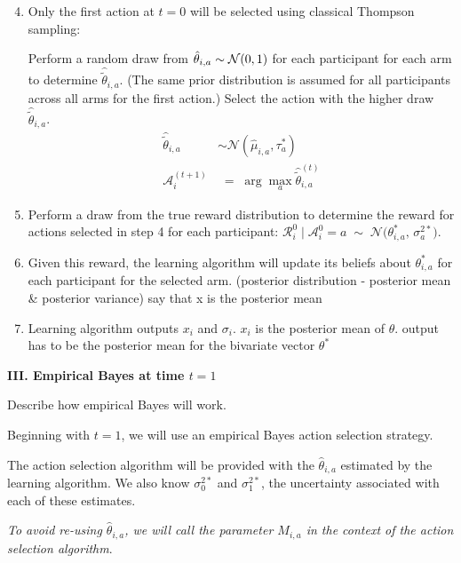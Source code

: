 \documentclass[letterpaper, 11pt]{extarticle}
\begin{document}
\begin{enumerate}
    \setcounter{enumi}{3}
    \item Only the first action at $t=0$ will be selected using classical Thompson sampling: 
    
    Perform a random draw from $\hat{\theta}_{i,a}\sim \mathcal{N}(0,1)$ for each participant for each arm to determine $\hat{\tilde{\theta}}_{i,a}$. (The same prior distribution is assumed for all participants across all arms for the first action.) Select the action with the higher draw $\hat{\tilde{\theta}}_{i,a}$.
    \begin{align*}
        \hat{\tilde{\theta}}_{i,a} &\sim \mathcal{N}(\hat{\mu}_{i,a}, \tau^{*}_{a})\\
        \mathcal A_i^{(t+1)} &\;=\; \arg\max_{a} \hat{\tilde{\theta}}_{i,a}^{(t)}
    \end{align*}
    \item Perform a draw from the true reward distribution to determine the reward for actions selected in step 4 for each participant: $\mathcal{R}_i^{0} \;\big|\; \mathcal{A}_i^{0} = a \;\sim\; \mathcal{N}\!\big(\theta_{i,a}^*, \, \sigma_{a}^{2*}\big)$.
    \item Given this reward, the learning algorithm will update its beliefs about $\theta^*_{i,a}$ for each participant for the selected arm. (posterior distribution - posterior mean \& posterior variance) say that x is the posterior mean 
    \item Learning algorithm outputs $x_i$ and $\sigma_i$. $x_i$ is the posterior mean of $\theta$. output has to be the posterior mean for the bivariate vector 
    $\theta^{*}$
\end{enumerate}

\textsf{\textbf {III. Empirical Bayes at time $t=1$}}

Describe how empirical Bayes will work. 

Beginning with $t=1$, we will use an empirical Bayes action selection strategy.

The action selection algorithm will be provided with the $\hat{\theta}_{i,a}$ estimated by the learning algorithm. We also know $\sigma_{0}^{2*}$ and $\sigma_{1}^{2*}$, the uncertainty associated with each of these estimates.

\textit{To avoid re-using $\hat{\theta}_{i,a}$, we will call the parameter $M_{i,a}$ in the context of the action selection algorithm}.
\end{document}
